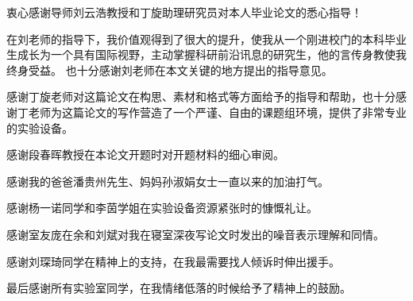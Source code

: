 
\begin{acknowledgements}
  衷心感谢导师刘云浩教授和丁旋助理研究员对本人毕业论文的悉心指导！
  
  在刘老师的指导下，我价值观得到了很大的提升，使我从一个刚进校门的本科毕业生成长为一个具有国际视野，主动掌握科研前沿讯息的研究生，他的言传身教使我终身受益。
  也十分感谢刘老师在本文关键的地方提出的指导意见。
  
  感谢丁旋老师对这篇论文在构思、素材和格式等方面给予的指导和帮助，也十分感谢丁老师为这篇论文的写作营造了一个严谨、自由的课题组环境，提供了非常专业的实验设备。

  感谢段春晖教授在本论文开题时对开题材料的细心审阅。
  
  感谢我的爸爸潘贵州先生、妈妈孙淑娟女士一直以来的加油打气。
  
  感谢杨一诺同学和李茵学姐在实验设备资源紧张时的慷慨礼让。
  
  感谢室友庞在余和刘斌对我在寝室深夜写论文时发出的噪音表示理解和同情。

  感谢刘琛琦同学在精神上的支持，在我最需要找人倾诉时伸出援手。

  最后感谢所有实验室同学，在我情绪低落的时候给予了精神上的鼓励。
\end{acknowledgements}
